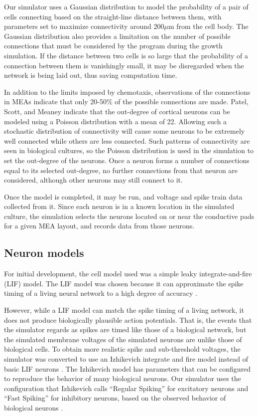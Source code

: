 \documentclass[letterpaper]{article}
\begin{document}
Our simulator uses a Gaussian distribution to model the probability of a pair of cells connecting based on the straight-line distance between them, with parameters set to maximize connectivity around 200$\mu$m from the cell body. 
The Gaussian distribution also provides a limitation on the number of possible connections that must be considered by the program during the growth simulation. 
If the distance between two cells is so large that the probability of a connection between them is vanishingly small, it may be disregarded when the network is being laid out, thus saving computation time. 

In addition to the limits imposed by chemotaxis, observations of the connections in MEAs indicate that only 20-50\% of the possible connections are made. 
Patel, Scott, and Meaney  indicate that the out-degree of cortical neurons can be modeled using a Poisson distribution with a mean of 22. 
Allowing such a stochastic distribution of connectivity will cause some neurons to be extremely well connected while others are less connected. 
Such patterns of connectivity are seen in biological cultures, so the Poisson distribution is used in the simulation to set the out-degree of the neurons. 
Once a neuron forms a number of connections equal to its selected out-degree, no further connections from that neuron are considered, although other neurons may still connect to it.

Once the model is completed, it may be run, and voltage and spike train data collected from it. 
Since each neuron is in a known location in the simulated culture, the simulation selects the neurons located on or near the conductive pads for a given MEA layout, and records data from those neurons. 

\subsection{Neuron models}

For initial development, the cell model used was a simple leaky integrate-and-fire (LIF) model. 
The LIF model was chosen because it can approximate the spike timing of a living neural network to a high degree of accuracy \cite{kahng2007stochastic,jolivet2004generalized}. 

However, while a LIF model can match the spike timing of a living network, it does not produce biologically plausible action potentials. 
That is, the events that the simulator regards as spikes are timed like those of a biological network, but the simulated membrane voltages of the simulated neurons are unlike those of biological cells. 
To obtain more realistic spike and sub-threshold voltages, the simulator was converted to use an Izhikevich integrate and fire model instead of basic LIF neurons \cite{izhikevich2003simple}.
The Izhikevich model has parameters that can be configured to reproduce the behavior of many biological neurons. 
Our simulator uses the configuration that Izhikevich calls ``Regular Spiking'' for excitatory neurons and ``Fast Spiking'' for inhibitory neurons, based on the observed behavior of biological neurons \cite{Izhikevich01082004}.
\end{document}
